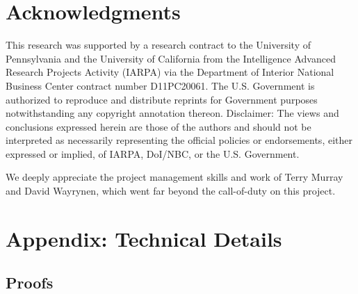 \documentclass[11pt]{article}
\theoremstyle{definition}
\theoremstyle{definition}
\begin{document}
\section*{Acknowledgments} 
This research was supported by a research contract to the University
of Pennsylvania and the University of California from the Intelligence Advanced Research Projects Activity
(IARPA) via the Department of Interior National Business Center
contract number D11PC20061. The U.S. Government is authorized to reproduce and
distribute reprints for Government purposes notwithstanding any
copyright annotation thereon. Disclaimer: The views and conclusions
expressed herein are those of the authors and should not be
interpreted as necessarily representing the official policies or
endorsements, either expressed or implied, of IARPA, DoI/NBC, or the
U.S. Government. 

We deeply appreciate the project management
skills and work of Terry Murray and David Wayrynen, which went far
beyond the call-of-duty on this project. 

\appendix 
\section*{Appendix: Technical Details}
\label{appendix}

\renewcommand{\thesubsection}{\Alph{subsection}}

\subsection{Proofs}
\end{document}
